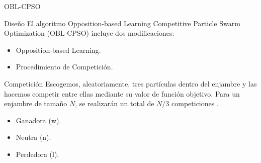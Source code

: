 \begin{frame}{}
\centering
\end{frame}


\begin{frame}{OBL-CPSO}
\begin{block}{Diseño}
El algoritmo Opposition-based Learning Competitive Particle Swarm Optimization (OBL-CPSO) \cite{oblcpso} incluye dos modificaciones:
\begin{itemize}
	\item Opposition-based Learning.
	\item Procedimiento de Competición.
\end{itemize}
\end{block}

\begin{block}{Competición}
Escogemos, aleatoriamente, tres partículas dentro del enjambre y las hacemos competir entre ellas mediante su valor de función objetivo. 
Para un enjambre de tamaño $N$, se realizarán un total de $N/3$ competiciones \cite{oblcpso}.
\begin{itemize}
  \Fontvi
  \item Ganadora (w).
  \item Neutra (n).
  \item Perdedora (l).
\end{itemize}
\end{block}
\end{frame}

